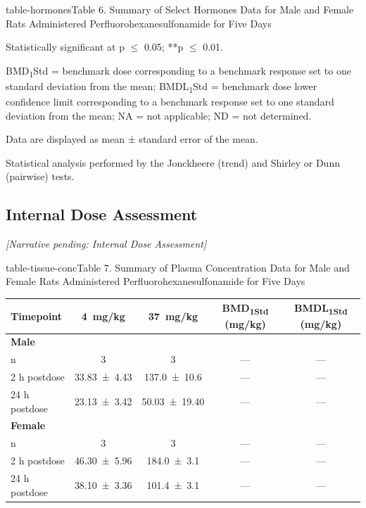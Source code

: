\begin{landscape}
\begin{niehstable}{table-hormones}{Table 6. Summary of Select Hormones Data for Male and Female Rats Administered Perfluorohexanesulfonamide for Five Days}
\begin{tablenotes}
\item *Statistically significant at p \ensuremath{\le} 0.05; **p \ensuremath{\le} 0.01.
\item BMD\textsubscript{1}Std = benchmark dose corresponding to a benchmark response set to one standard deviation from the mean; BMDL\textsubscript{1}Std = benchmark dose lower confidence limit corresponding to a benchmark response set to one standard deviation from the mean; NA = not applicable; ND = not determined.
\item[a] Data are displayed as mean ± standard error of the mean.
\item[b] Statistical analysis performed by the Jonckheere (trend) and Shirley or Dunn (pairwise) tests.
\end{tablenotes}
\end{niehstable}
\end{landscape}

\subsection{Internal Dose Assessment}

\emph{[Narrative pending: Internal Dose Assessment]}

\begin{niehstable}{table-tissue-conc}{Table 7. Summary of Plasma Concentration Data for Male and Female Rats Administered Perfluorohexanesulfonamide for Five Days}
\begin{tabular}{lcccc}
\toprule
Timepoint & 4~mg/kg & 37~mg/kg & BMD\textsubscript{1Std} (mg/kg) & BMDL\textsubscript{1Std} (mg/kg) \\
\midrule
\multicolumn{5}{l}{\textbf{Male}} \\
n & 3 & 3 & — & — \\
2 h postdose & 33.83 ± 4.43 & 137.0 ± 10.6 & — & — \\
24 h postdose & 23.13 ± 3.42 & 50.03 ± 19.40 & — & — \\
\multicolumn{5}{l}{\textbf{Female}} \\
n & 3 & 3 & — & — \\
2 h postdose & 46.30 ± 5.96 & 184.0 ± 3.1 & — & — \\
24 h postdose & 38.10 ± 3.36 & 101.4 ± 3.1 & — & — \\
\bottomrule
\end{tabular}
\end{niehstable}


